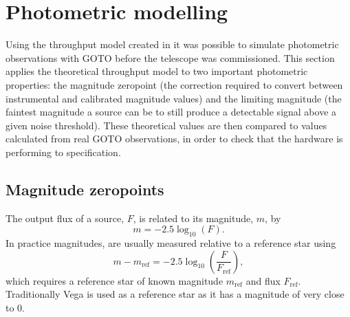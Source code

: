 
\newpage
\section{Photometric modelling}
\label{sec:photometry}
\begin{colsection}


\begin{colsection}

Using the throughput model created in  it was possible to simulate photometric observations with GOTO before the telescope was commissioned. This section applies the theoretical throughput model to two important photometric properties: the magnitude zeropoint (the correction required to convert between instrumental and calibrated magnitude values) and the limiting magnitude (the faintest magnitude a source can be to still produce a detectable signal above a given noise threshold). These theoretical values are then compared to values calculated from real GOTO observations, in order to check that the hardware is performing to specification.

\end{colsection}

\subsection{Magnitude zeropoints}
\label{sec:zeropoints}
\begin{colsection}

The output flux of a source, $F$, is related to its magnitude, $m$, by
%
\begin{equation}
    m = -2.5 \log_{10}(F).
    \label{eq:apparent_magnitude}
\end{equation}
%
In practice magnitudes, are usually measured relative to a reference star using
%
\begin{equation}
    m - m_\text{ref} = -2.5 \log_{10}\left(\frac{F}{F_\text{ref}}\right),
    \label{eq:magnitude_ref}
\end{equation}
%
which requires a reference star of known magnitude $m_\text{ref}$ and flux $F_\text{ref}$. Traditionally Vega is used as a reference star as it has a magnitude of very close to 0.


\end{colsection}
\end{colsection}
